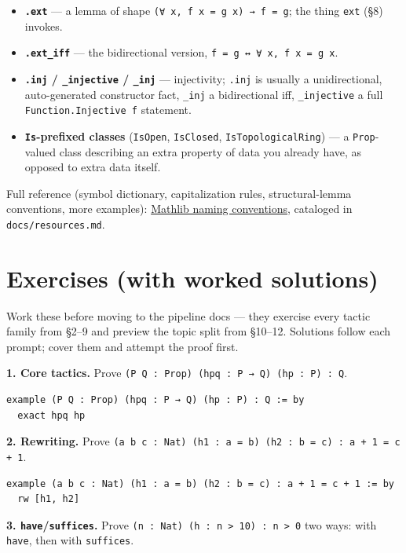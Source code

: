 \begin{itemize}
  \item \textbf{\texttt{.ext}} --- a lemma of shape \texttt{(∀ x, f x = g x) → f = g}; the thing \texttt{ext} (\S8) invokes.
  \item \textbf{\texttt{.ext\_iff}} --- the bidirectional version, \texttt{f = g ↔ ∀ x, f x = g x}.
  \item \textbf{\texttt{.inj} / \texttt{\_injective} / \texttt{\_inj}} --- injectivity; \texttt{.inj} is usually a unidirectional, auto-generated constructor fact, \texttt{\_inj} a bidirectional iff, \texttt{\_injective} a full \texttt{Function.Injective f} statement.
  \item \textbf{\texttt{Is}-prefixed classes} (\texttt{IsOpen}, \texttt{IsClosed}, \texttt{IsTopologicalRing}) --- a \texttt{Prop}-valued class describing an extra property of data you already have, as opposed to extra data itself.
\end{itemize}

Full reference (symbol dictionary, capitalization rules, structural-lemma conventions, more examples): \href{https://leanprover-community.github.io/contribute/naming.html}{Mathlib naming conventions}, cataloged in \texttt{docs/resources.md}.

\section{Exercises (with worked solutions)}

Work these before moving to the pipeline docs --- they exercise every tactic family from \S2--9 and preview the topic split from \S10--12. Solutions follow each prompt; cover them and attempt the proof first.

\textbf{1. Core tactics.} Prove \texttt{(P Q : Prop) (hpq : P → Q) (hp : P) : Q}.

\begin{verbatim}
example (P Q : Prop) (hpq : P → Q) (hp : P) : Q := by
  exact hpq hp
\end{verbatim}

\textbf{2. Rewriting.} Prove \texttt{(a b c : Nat) (h1 : a = b) (h2 : b = c) : a + 1 = c + 1}.

\begin{verbatim}
example (a b c : Nat) (h1 : a = b) (h2 : b = c) : a + 1 = c + 1 := by
  rw [h1, h2]
\end{verbatim}

\textbf{3. \texttt{have}/\texttt{suffices}.} Prove \texttt{(n : Nat) (h : n > 10) : n > 0} two ways: with \texttt{have}, then with \texttt{suffices}.

